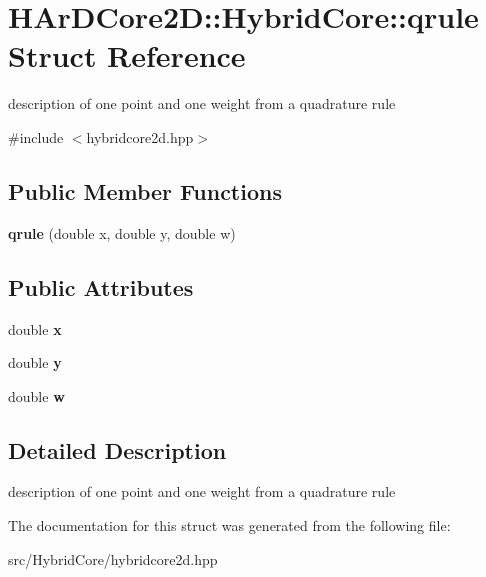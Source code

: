 \hypertarget{structHArDCore2D_1_1HybridCore_1_1qrule}{}\section{H\+Ar\+D\+Core2D\+:\+:Hybrid\+Core\+:\+:qrule Struct Reference}
\label{structHArDCore2D_1_1HybridCore_1_1qrule}


description of one point and one weight from a quadrature rule  




{\ttfamily \#include $<$hybridcore2d.\+hpp$>$}

\subsection*{Public Member Functions}
\begin{DoxyCompactItemize}
\item 
\mbox{\label{structHArDCore2D_1_1HybridCore_1_1qrule_ae3e8af15fb16e965ae4473ea1b63b91b}} 
{\bfseries qrule} (double x, double y, double w)
\end{DoxyCompactItemize}
\subsection*{Public Attributes}
\begin{DoxyCompactItemize}
\item 
\mbox{\label{structHArDCore2D_1_1HybridCore_1_1qrule_aa0949349d77246716dab1b949b29dcc4}} 
double {\bfseries x}
\item 
\mbox{\label{structHArDCore2D_1_1HybridCore_1_1qrule_a1de7c1f4777b991609cf13fb33ea9cc3}} 
double {\bfseries y}
\item 
\mbox{\label{structHArDCore2D_1_1HybridCore_1_1qrule_ae2dc056e1cd6d7fec1016f697e476890}} 
double {\bfseries w}
\end{DoxyCompactItemize}


\subsection{Detailed Description}
description of one point and one weight from a quadrature rule 

The documentation for this struct was generated from the following file\+:\begin{DoxyCompactItemize}
\item 
src/\+Hybrid\+Core/hybridcore2d.\+hpp\end{DoxyCompactItemize}
